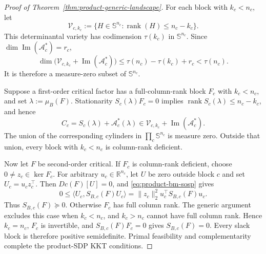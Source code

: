 \documentclass[10pt,a4paper]{amsart}
\begin{document}
\begin{proof}[Proof of Theorem~\ref{thm:product-generic-landscape}]
For each block with $k_c<n_c$, let
\[
  \mathcal V_{c,k_c}
  :=\{H\in\mathbb S^{n_c}:
          \operatorname{rank}(H)\leq n_c-k_c\}.
\]
This determinantal variety has codimension $\tau(k_c)$ in
$\mathbb S^{n_c}$.  Since
$\dim\operatorname{Im}(\mathcal A_c^*)=r_c$,
\[
  \dim\bigl(
    \mathcal V_{c,k_c}+\operatorname{Im}(\mathcal A_c^*)
  \bigr)
  \leq \tau(n_c)-\tau(k_c)+r_c
  <\tau(n_c).
\]
It is therefore a measure-zero subset of $\mathbb S^{n_c}$.

Suppose a first-order critical factor has a full-column-rank block $F_c$
with $k_c<n_c$, and set $\lambda:=\mu_B(F)$.  Stationarity
$S_c(\lambda)F_c=0$ implies
$\operatorname{rank}S_c(\lambda)\leq n_c-k_c$, and hence
\[
  C_c
  =S_c(\lambda)+\mathcal A_c^*(\lambda)
  \in
  \mathcal V_{c,k_c}+\operatorname{Im}(\mathcal A_c^*).
\]
The union of the corresponding cylinders in
$\prod_c\mathbb S^{n_c}$ is measure zero.  Outside that union, every block
with $k_c<n_c$ is column-rank deficient.

Now let $F$ be second-order critical.  If $F_c$ is column-rank deficient,
choose $0\neq z_c\in\ker F_c$.  For arbitrary
$u_c\in\mathbb R^{n_c}$, let $U$ be zero outside block $c$ and set
$U_c=u_cz_c^\top$.  Then $Dc(F)[U]=0$, and
\eqref{eq:product-bm-sosp} gives
\[
  0\leq
  \langle U_c,S_{B,c}(F)U_c\rangle
  =\|z_c\|_2^2u_c^\top S_{B,c}(F)u_c.
\]
Thus $S_{B,c}(F)\succeq0$.  Otherwise $F_c$ has full column rank.  The
generic argument excludes this case when $k_c<n_c$, and $k_c>n_c$ cannot
have full column rank.  Hence $k_c=n_c$, $F_c$ is invertible, and
$S_{B,c}(F)F_c=0$ gives $S_{B,c}(F)=0$.  Every slack block is therefore
positive semidefinite.  Primal feasibility and complementarity complete the
product-SDP KKT conditions.
\end{proof}
\end{document}
